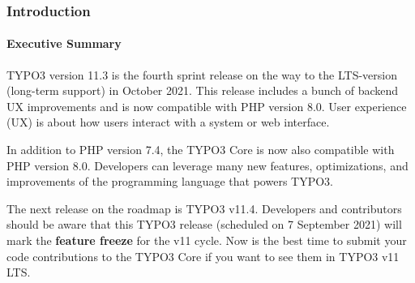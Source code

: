 %

\begin{frame}[fragile]
	\frametitle{Introduction}
	\framesubtitle{Executive Summary}

	\small
		TYPO3 version 11.3 is the fourth sprint release on the way to the LTS-version
		(long-term support) in October 2021. This release includes a bunch of backend
		UX improvements and is now compatible with PHP version 8.0. User experience
		(UX) is about how users interact with a system or web interface.

		\vspace{0.2cm}

		In addition to PHP version 7.4, the TYPO3 Core is now also compatible
		with PHP version 8.0. Developers can leverage many new features,
		optimizations, and improvements of the programming language that powers
		TYPO3.

		\vspace{0.2cm}

		The next release on the roadmap is TYPO3 v11.4. Developers and contributors
		should be aware that this TYPO3 release (scheduled on 7 September 2021)
		will mark the \textbf{feature freeze} for the v11 cycle. Now is the best
		time to submit your code contributions to the TYPO3 Core if you want to
		see them in TYPO3 v11 LTS.
	\normalsize

\end{frame}

